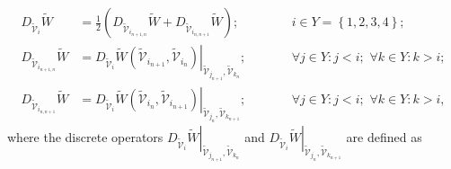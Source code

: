 \begin{equation}\label{eqn:definition of partitioned discrete gradient}
\begin{aligned}
D_{\widetilde{\mathcal{V}}_i}\widetilde{W} & = \frac{1}{2}\left(D_{\widetilde{\mathcal{V}}_{i_{n+1,n}}}\widetilde{W} + D_{\widetilde{\mathcal{V}}_{i_{n,n+1}}}\widetilde{W}\right);&\qquad &i\in Y = \left\{1,2,3,4\right\};\\
%
D_{\widetilde{\mathcal{V}}_{i_{n+1,n}}}\widetilde{W} &= \left.D_{\widetilde{\mathcal{V}}_i}\widetilde{W}\left(\widetilde{\mathcal{V}}_{i_{n+1}},\widetilde{\mathcal{V}}_{i_{n}}\right)\right\vert_{\widetilde{\mathcal{V}}_{j_{n+1}},\widetilde{\mathcal{V}}_{k_{n}}};&\qquad &\forall j\in Y: j<i;\,\, \forall k\in Y: k >i;\\
%
%
D_{\widetilde{\mathcal{V}}_{i_{n,n+1}}}\widetilde{W} &= \left.D_{\widetilde{\mathcal{V}}_i}\widetilde{W}\left(\widetilde{\mathcal{V}}_{i_{n}},\widetilde{\mathcal{V}}_{i_{n+1}}\right)\right\vert_{\widetilde{\mathcal{V}}_{j_{n}},\widetilde{\mathcal{V}}_{k_{n+1}}};&\qquad &\forall j\in Y: j<i;\,\, \forall k\in Y: k >i,
%
\end{aligned}
\end{equation}
%
where the discrete operators $\left.D_{\widetilde{\mathcal{V}}_i}\widetilde{W}\right\vert_{\widetilde{\mathcal{V}}_{j_{n+1}},\widetilde{\mathcal{V}}_{k_{n}}}$ and $\left.D_{\widetilde{\mathcal{V}}_i}\widetilde{W}\right\vert_{\widetilde{\mathcal{V}}_{j_{n}},\widetilde{\mathcal{V}}_{k_{n+1}}}$ are defined as
%
